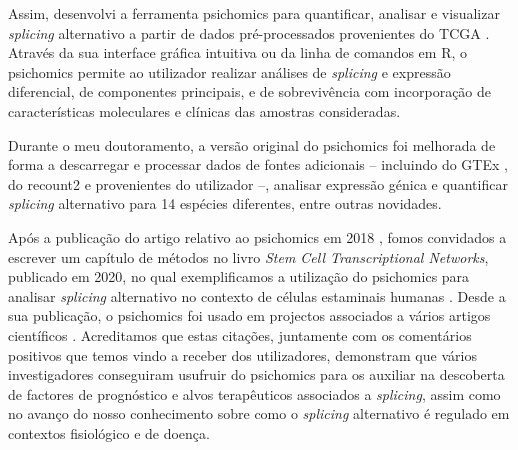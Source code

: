 Assim, desenvolvi a ferramenta psichomics para quantificar, analisar e visualizar \emph{splicing} alternativo a partir de dados pré-processados provenientes do TCGA \cite{chang:2013ww}. Através da sua interface gráfica intuitiva ou da linha de comandos em R, o psichomics permite ao utilizador realizar análises de \emph{splicing} e expressão diferencial, de componentes principais, e de sobrevivência com incorporação de características moleculares e clínicas das amostras consideradas.

Durante o meu doutoramento, a versão original do psichomics foi melhorada de forma a descarregar e processar dados de fontes adicionais -- incluindo do GTEx \cite{lonsdale:2013uo}, do recount2 \cite{collado-torres:2017uw} e provenientes do utilizador --, analisar expressão génica e quantificar \emph{splicing} alternativo para 14 espécies diferentes, entre outras novidades.


Após a publicação do artigo relativo ao psichomics em 2018 \cite{saraiva-agostinho:2018uq}, fomos convidados a escrever um capítulo de métodos no livro \emph{Stem Cell Transcriptional Networks}, publicado em 2020, no qual exemplificamos a utilização do psichomics para analisar \emph{splicing} alternativo no contexto de células estaminais humanas \cite{saraiva-agostinho:2020wz}. Desde a sua publicação, o psichomics foi usado em projectos associados a vários artigos científicos \cite{coomer:2019wz,baeza-centurion:2019tb,munkley:2019wr,baeza-centurion:2020vb}. Acreditamos que estas citações, juntamente com os comentários positivos que temos vindo a receber dos utilizadores, demonstram que vários investigadores conseguiram usufruir do psichomics para os auxiliar na descoberta de factores de prognóstico e alvos terapêuticos associados a \emph{splicing}, assim como no avanço do nosso conhecimento sobre como o \emph{splicing} alternativo é regulado em contextos fisiológico e de doença.

